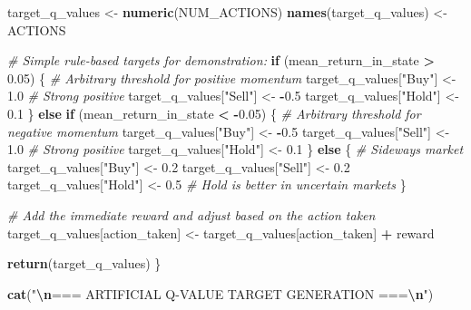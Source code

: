 \documentclass[
]{article}
\newenvironment{Shaded}{\begin{snugshade}}{\end{snugshade}}
\newcommand{\CommentTok}[1]{\textcolor[rgb]{0.56,0.35,0.01}{\textit{#1}}}
\newcommand{\ControlFlowTok}[1]{\textcolor[rgb]{0.13,0.29,0.53}{\textbf{#1}}}
\newcommand{\FloatTok}[1]{\textcolor[rgb]{0.00,0.00,0.81}{#1}}
\newcommand{\FunctionTok}[1]{\textcolor[rgb]{0.13,0.29,0.53}{\textbf{#1}}}
\newcommand{\NormalTok}[1]{#1}
\newcommand{\OtherTok}[1]{\textcolor[rgb]{0.56,0.35,0.01}{#1}}
\newcommand{\SpecialCharTok}[1]{\textcolor[rgb]{0.81,0.36,0.00}{\textbf{#1}}}
\newcommand{\StringTok}[1]{\textcolor[rgb]{0.31,0.60,0.02}{#1}}
\begin{document}
\begin{Shaded}
\begin{Highlighting}[]
\NormalTok{  target\_q\_values }\OtherTok{\textless{}{-}} \FunctionTok{numeric}\NormalTok{(NUM\_ACTIONS)}
  \FunctionTok{names}\NormalTok{(target\_q\_values) }\OtherTok{\textless{}{-}}\NormalTok{ ACTIONS}
  
  \CommentTok{\# Simple rule{-}based targets for demonstration:}
  \ControlFlowTok{if}\NormalTok{ (mean\_return\_in\_state }\SpecialCharTok{\textgreater{}} \FloatTok{0.05}\NormalTok{) \{ }\CommentTok{\# Arbitrary threshold for positive momentum}
\NormalTok{    target\_q\_values[}\StringTok{"Buy"}\NormalTok{] }\OtherTok{\textless{}{-}} \FloatTok{1.0} \CommentTok{\# Strong positive}
\NormalTok{    target\_q\_values[}\StringTok{"Sell"}\NormalTok{] }\OtherTok{\textless{}{-}} \SpecialCharTok{{-}}\FloatTok{0.5}
\NormalTok{    target\_q\_values[}\StringTok{"Hold"}\NormalTok{] }\OtherTok{\textless{}{-}} \FloatTok{0.1}
\NormalTok{  \} }\ControlFlowTok{else} \ControlFlowTok{if}\NormalTok{ (mean\_return\_in\_state }\SpecialCharTok{\textless{}} \SpecialCharTok{{-}}\FloatTok{0.05}\NormalTok{) \{ }\CommentTok{\# Arbitrary threshold for negative momentum}
\NormalTok{    target\_q\_values[}\StringTok{"Buy"}\NormalTok{] }\OtherTok{\textless{}{-}} \SpecialCharTok{{-}}\FloatTok{0.5}
\NormalTok{    target\_q\_values[}\StringTok{"Sell"}\NormalTok{] }\OtherTok{\textless{}{-}} \FloatTok{1.0} \CommentTok{\# Strong positive}
\NormalTok{    target\_q\_values[}\StringTok{"Hold"}\NormalTok{] }\OtherTok{\textless{}{-}} \FloatTok{0.1}
\NormalTok{  \} }\ControlFlowTok{else}\NormalTok{ \{ }\CommentTok{\# Sideways market}
\NormalTok{    target\_q\_values[}\StringTok{"Buy"}\NormalTok{] }\OtherTok{\textless{}{-}} \FloatTok{0.2}
\NormalTok{    target\_q\_values[}\StringTok{"Sell"}\NormalTok{] }\OtherTok{\textless{}{-}} \FloatTok{0.2}
\NormalTok{    target\_q\_values[}\StringTok{"Hold"}\NormalTok{] }\OtherTok{\textless{}{-}} \FloatTok{0.5} \CommentTok{\# Hold is better in uncertain markets}
\NormalTok{  \}}
  
  \CommentTok{\# Add the immediate reward and adjust based on the action taken}
\NormalTok{  target\_q\_values[action\_taken] }\OtherTok{\textless{}{-}}\NormalTok{ target\_q\_values[action\_taken] }\SpecialCharTok{+}\NormalTok{ reward}
  
  \FunctionTok{return}\NormalTok{(target\_q\_values)}
\NormalTok{\}}

\FunctionTok{cat}\NormalTok{(}\StringTok{"}\SpecialCharTok{\textbackslash{}n}\StringTok{=== ARTIFICIAL Q{-}VALUE TARGET GENERATION ===}\SpecialCharTok{\textbackslash{}n}\StringTok{"}\NormalTok{)}
\end{Highlighting}
\end{Shaded}
\end{document}
